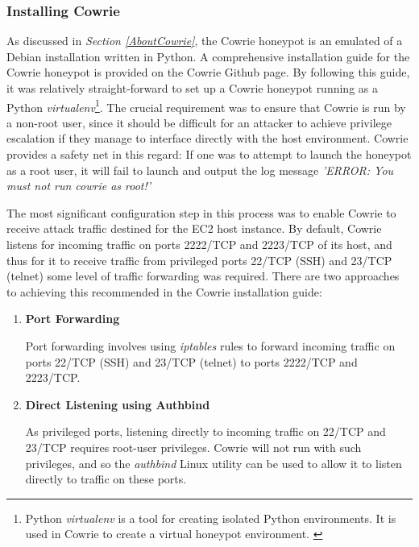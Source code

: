 \subsubsection{Installing Cowrie}    \label{InstallingCowrie}
As discussed in \textit{Section \ref{AboutCowrie}}, the Cowrie honeypot is an emulated of a Debian installation written in Python. A comprehensive installation guide for the Cowrie honeypot is provided on the Cowrie Github page. \cite{CowrieInstallationInstructions} By following this guide, it was relatively straight-forward to set up a Cowrie honeypot running as a Python \textit{virtualenv}\footnote{Python \textit{virtualenv} is a tool for creating isolated Python environments. It is used in Cowrie to create a virtual honeypot environment. \cite{VirtualEnvReference}}. The crucial requirement was to ensure that Cowrie is run by a non-root user, since it should be difficult for an attacker to achieve privilege escalation if they manage to interface directly with the host environment. Cowrie provides a safety net in this regard: If one was to attempt to launch the honeypot as a root user, it will fail to launch and output the log message \textit{'ERROR: You must not run cowrie as root!'}

The most significant configuration step in this process was to enable Cowrie to receive attack traffic destined for the EC2 host instance. By default, Cowrie listens for incoming traffic on ports 2222/TCP and 2223/TCP of its host, and thus for it to receive traffic from privileged ports 22/TCP (SSH) and 23/TCP (telnet)  some level of traffic forwarding was required. There are two approaches to achieving this recommended in the Cowrie installation guide: \cite{CowrieInstallationInstructions}

\begin{enumerate}
\item \textbf{Port Forwarding} 

Port forwarding involves using \textit{iptables} rules to forward incoming traffic on ports 22/TCP (SSH) and 23/TCP (telnet) to ports 2222/TCP and 2223/TCP.

\item \textbf{Direct Listening using Authbind}

As privileged ports, listening directly to incoming traffic on 22/TCP and 23/TCP requires root-user privileges. Cowrie will not run with such privileges, and so the \textit{authbind} Linux utility can be used to allow it to listen directly to traffic on these ports.

\end{enumerate}

